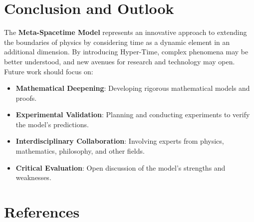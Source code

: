 \documentclass[11pt,a4paper]{article}
\begin{document}
\section{Conclusion and Outlook}

The \textbf{Meta-Spacetime Model} represents an innovative approach to extending the boundaries of physics by considering time as a dynamic element in an additional dimension. By introducing Hyper-Time, complex phenomena may be better understood, and new avenues for research and technology may open. Future work should focus on:

\begin{itemize}
    \item \textbf{Mathematical Deepening}: Developing rigorous mathematical models and proofs.
    \item \textbf{Experimental Validation}: Planning and conducting experiments to verify the model's predictions.
    \item \textbf{Interdisciplinary Collaboration}: Involving experts from physics, mathematics, philosophy, and other fields.
    \item \textbf{Critical Evaluation}: Open discussion of the model's strengths and weaknesses.
\end{itemize}

\section*{References}
\end{document}

